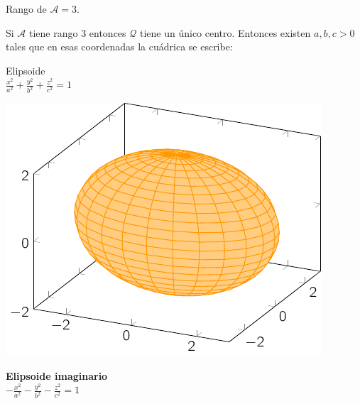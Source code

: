 Rango de $\mathcal A = 3$.

Si $\mathcal A$ tiene rango $3$ entonces $\mathcal Q$ tiene un único centro.
Entonces existen $a,b,c > 0$ tales que en esas coordenadas la cuádrica se escribe:

\begin{minipage}[c]{0.45\textwidth}
  {Elipsoide}\vspace{1em}\\
  $\displaystyle \frac{{x}^2}{a^2} + \frac{{y}^2}{b^2}+\frac{{z}^2}{c^2} = 1$
\end{minipage}\hfill
\begin{minipage}[]{0.45\textwidth}
    \includegraphics{./img/elde.pdf}
\end{minipage}

\begin{minipage}[c]{0.45\textwidth}
  {\bf Elipsoide imaginario}\vspace{1em}\\
  $\displaystyle -\frac{{x}^2}{a^2} - \frac{{y}^2}{b^2} - \frac{{z}^2}{c^2} = 1$
\end{minipage}\hfill
\begin{minipage}[]{0.45\textwidth}
\hfill
\end{minipage}

